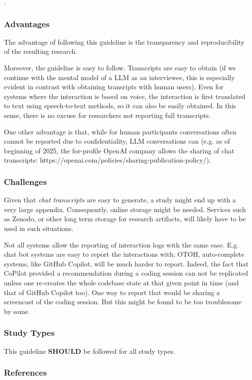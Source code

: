 \documentclass[11pt]{article}
\newcommand{\should}{\textbf{SHOULD}\xspace}
\begin{document}
. 


\subsubsection{Advantages}

The advantage of following this guideline is the transparency and reproducibility of the resulting research. 

Moreover, the guideline is easy to follow. Transcripts are easy to obtain (if we continue with the mental model of a LLM as an interviewee, this is especially evident in contrast with obtaining transripts with human users). Even for systems where the interaction is based on voice, the interaction is first translated to text using speech-to-text methods, so it can also be easily obtained. In this sense, there is no excuse for researchers not reporting full transcripts. 

One other advantage is that, while for human participants conversations often cannot be reported due to confidentiality, LLM conversations can (e.g. as of beginning of 2025, the for-profile OpenAI company allows the sharing of chat transcripts: https://openai.com/policies/sharing-publication-policy/). 


\subsubsection{Challenges}

Given that {\em chat transcripts} are easy to generate, a study might end up with a very large appendix. Consequently, online storage might be needed. Services such as Zenodo, or other long term storage for research artifacts, will likely have to be used in such situations.

Not all systems allow the reporting of interaction logs with the same ease. E.g. chat bot systems are easy to report the interactions with; OTOH, auto-complete systems, like GitHub Copilot, will be much harder to report. Indeed, the fact that CoPilot provided a recommendation during a coding session can not be replicated unless one re-creates the whole codebase state at that given point in time (and that of GitHub Copilot too). One way to report that would be sharing a screencast of the coding session. But this might be found to be too troublesome by some. 


\subsubsection{Study Types}

This guideline \should be followed for all study types. 


\subsubsection{References}



\end{document}
